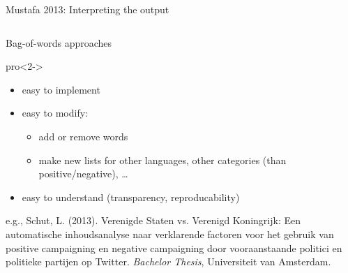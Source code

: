 \documentclass{beamer}
\begin{document}
{
\begin{frame}[plain]
\end{frame}
\begin{frame}[plain]
\end{frame}
}



\begin{frame}{Mustafa 2013: Interpreting the output}

\begin{columns}
\end{columns}
\end{frame}



\begin{frame}{Bag-of-words approaches}
\begin{block}{pro}<2->
\begin{itemize}
\item easy to implement
\item easy to modify:
\begin{itemize}
\item add or remove words
\item make new lists for other languages, other categories (than positive/negative), \dots
\end{itemize}
\item easy to understand (transparency, reproducability)
\end{itemize}
\end{block}
\par
\tiny{e.g., Schut, L. (2013). Verenigde Staten vs. Verenigd Koningrijk: Een automatische inhoudsanalyse naar verklarende factoren voor het gebruik van positive campaigning en negative campaigning door vooraanstaande politici en politieke partijen op Twitter. \emph{Bachelor Thesis}, Universiteit van Amsterdam.}\\
\end{frame}
\end{document}
